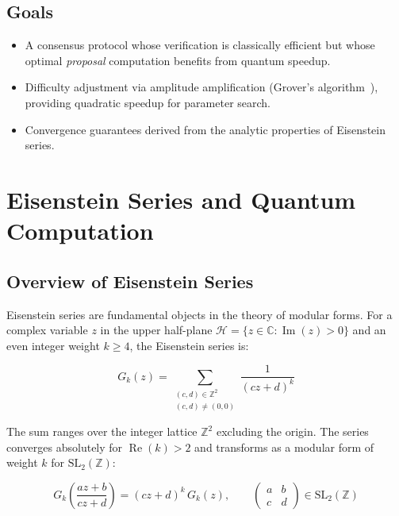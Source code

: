 \documentclass[11pt,a4paper]{article}
\begin{document}
\subsection{Goals}

\begin{itemize}[nosep]
  \item A consensus protocol whose verification is classically efficient
        but whose optimal \emph{proposal} computation benefits from
        quantum speedup.
  \item Difficulty adjustment via amplitude amplification (Grover's
        algorithm~\cite{grover1996}), providing quadratic speedup for
        parameter search.
  \item Convergence guarantees derived from the analytic properties of
        Eisenstein series.
\end{itemize}

\section{Eisenstein Series and Quantum Computation}

\subsection{Overview of Eisenstein Series}

Eisenstein series are fundamental objects in the theory of modular
forms. For a complex variable $z$ in the upper half-plane
$\mathcal{H} = \{z \in \mathbb{C} : \operatorname{Im}(z) > 0\}$
and an even integer weight $k \geq 4$, the Eisenstein series is:

\begin{equation}\label{eq:eisenstein}
G_k(z) = \sum_{\substack{(c,d) \in \mathbb{Z}^2 \\ (c,d) \neq (0,0)}}
\frac{1}{(cz + d)^k}
\end{equation}

The sum ranges over the integer lattice $\mathbb{Z}^2$ excluding the
origin. The series converges absolutely for $\operatorname{Re}(k) > 2$
and transforms as a modular form of weight $k$ for
$\mathrm{SL}_2(\mathbb{Z})$:

\[
G_k\!\left(\frac{az+b}{cz+d}\right) = (cz+d)^k \, G_k(z),
\qquad
\begin{pmatrix} a & b \\ c & d \end{pmatrix} \in \mathrm{SL}_2(\mathbb{Z})
\]
\end{document}
